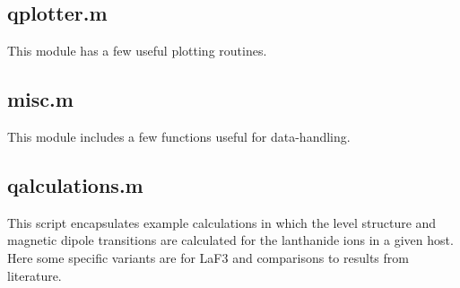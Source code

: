 \documentclass{article}
\begin{document}
\subsection{qplotter.m}

This module has a few useful plotting routines.



\subsection{misc.m}

This module includes a few functions useful for data-handling.



\subsection{qalculations.m}

This script encapsulates example calculations in which the level structure and magnetic dipole transitions are calculated for the lanthanide ions in a given host. Here some specific variants are for LaF3 and comparisons to results from literature.



\newpage

\printbibliography

\newpage

\printindex
\end{document}
